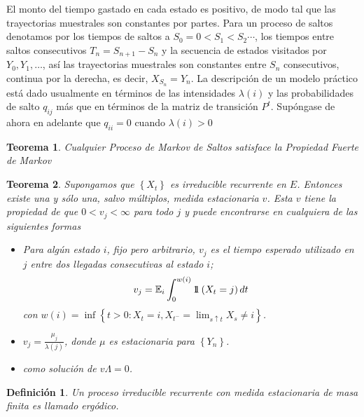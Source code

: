 \documentclass{article}
\newtheorem{Def}{Definición}[section]
\newtheorem{Teo}{Teorema}[section]
\newcommand{\esp}{\mathbb{E}}
\newcommand{\indora}{\mbox{$1$\hspace{-0.8ex}$1$}}
\numberwithin{equation}{section}
\begin{document}
El monto del tiempo gastado en cada estado es positivo, de modo tal que las trayectorias muestrales son constantes por partes. Para un proceso de saltos denotamos por los tiempos de saltos a $S_{0}=0<S_{1}<S_{2}\cdots$, los tiempos entre saltos consecutivos $T_{n}=S_{n+1}-S_{n}$ y la secuencia de estados visitados por $Y_{0},Y_{1},\ldots$, as\'i las trayectorias muestrales son constantes entre $S_{n}$ consecutivos, continua por la derecha, es decir, $X_{S_{n}}=Y_{n}$.  La descripci\'on de un modelo pr\'actico est\'a dado usualmente en t\'erminos de las intensidades $\lambda\left(i\right)$ y las probabilidades de salto $q_{ij}$ m\'as que en t\'erminos de la matriz de transici\'on $P^{t}$. Sup\'ongase de ahora en adelante que $q_{ii}=0$ cuando $\lambda\left(i\right)>0$

\begin{Teo}
Cualquier Proceso de Markov de Saltos satisface la Propiedad Fuerte de Markov
\end{Teo}

\begin{Teo}\label{Teo.4.2}
Supongamos que $\left\{X_{t}\right\}$ es irreducible recurrente en $E$. Entonces existe una y s\'olo una, salvo m\'ultiplos, medida estacionaria $v$. Esta $v$ tiene la propiedad de que $0<v_{j}<\infty$ para todo $j$ y puede encontrarse en cualquiera de las siguientes formas

\begin{itemize}
\item[i)] Para alg\'un estado $i$, fijo pero arbitrario, $v_{j}$ es el tiempo esperado utilizado en $j$ entre dos llegadas consecutivas al estado $i$;
\begin{equation}\label{Eq.4.2}
v_{j}=\esp_{i}\int_{0}^{w\left(i\right)}\indora\left(X_{t}=j\right)dt
\end{equation}
con $w\left(i\right)=\inf\left\{t>0:X_{t}=i,X_{t^{-}}=\lim_{s\uparrow t}X_{s}\neq i\right\}$. 
\item[ii)]
$v_{j}=\frac{\mu_{j}}{\lambda\left(j\right)}$, donde $\mu$ es estacionaria para $\left\{Y_{n}\right\}$. \item[iii)] como
soluci\'on de $v\Lambda=0$.
\end{itemize}
\end{Teo}

\begin{Def}
Un proceso irreducible recurrente con medida estacionaria de masa finita es llamado erg\'odico.
\end{Def}
\end{document}
